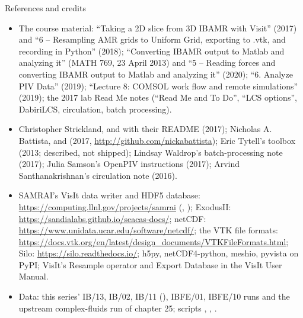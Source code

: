 \documentclass[aspectratio=169,11pt]{beamer}
\begin{document}
\begin{frame}{References and credits}
\label{fr:refs}
\scriptsize
\begin{itemize}
  \item The course material: ``Taking a 2D slice from 3D IBAMR with Visit'' (2017) and ``6 -- Resampling AMR grids to Uniform Grid, exporting to .vtk, and recording in Python'' (2018); ``Converting IBAMR output to Matlab and analyzing it'' (MATH 769, 23 April 2013) and ``5 -- Reading forces and converting IBAMR output to Matlab and analyzing it'' (2020); ``6. Analyze PIV Data'' (2019); ``Lecture 8: COMSOL work flow and remote simulations'' (2019); the 2017 lab Read Me notes (``Read Me and To Do'', ``LCS options'', DabiriLCS, circulation, batch processing).
  \item Christopher Strickland,  and  with their README (2017); Nicholas A. Battista,  and  (2017, \url{http://github.com/nickabattista}); Eric Tytell's  toolbox (2013; described, not shipped); Lindsay Waldrop's batch-processing note (2017); Julia Samson's OpenPIV instructions (2017); Arvind Santhanakrishnan's circulation note (2016).
  \item SAMRAI's VisIt data writer and HDF5 database: \url{https://computing.llnl.gov/projects/samrai} (, ); ExodusII: \url{https://sandialabs.github.io/seacas-docs/}; netCDF: \url{https://www.unidata.ucar.edu/software/netcdf/}; the VTK file formats: \url{https://docs.vtk.org/en/latest/design_documents/VTKFileFormats.html}; Silo: \url{https://silo.readthedocs.io/}; h5py, netCDF4-python, meshio, pyvista on PyPI; VisIt's Resample operator and Export Database in the VisIt User Manual.
  \item Data: this series' IB/13, IB/02, IB/11 (), IBFE/01, IBFE/10 runs and the upstream complex-fluids  run of chapter 25; scripts , , .
\end{itemize}
\end{frame}
\end{document}

